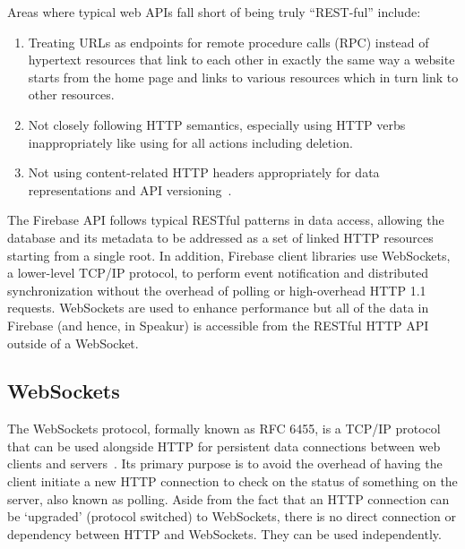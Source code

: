 Areas where typical web APIs fall short of being truly ``REST-ful'' include:
\begin{enumerate}
\item Treating URLs as endpoints for remote procedure calls (RPC) instead of hypertext resources that link to each other in exactly the same way a website starts from the home page and links to various resources which in turn link to other resources.
\item Not closely following HTTP semantics, especially using HTTP verbs inappropriately like using  for all actions including deletion.
\item Not using content-related HTTP headers appropriately for data representations and API versioning~\cite{steveklabnik2011}.
\end{enumerate}

The Firebase API follows typical RESTful patterns in data access, allowing the database 
and its metadata to be addressed as a set of linked HTTP resources starting from a single root.
In addition, Firebase client libraries use WebSockets, 
a lower-level TCP/IP protocol, 
to perform event notification and distributed synchronization without the overhead of polling or high-overhead HTTP 1.1 requests.
WebSockets are used to enhance performance but all of the data in Firebase 
(and hence, in Speakur) 
is accessible from the RESTful HTTP API outside of a WebSocket.

\subsection{WebSockets}
\label{sec:websockets}
The WebSockets protocol, formally known as RFC 6455, 
is a TCP/IP protocol that can be used alongside HTTP for persistent data connections between web clients and servers~\cite{mozillacontributors2015-a}.
Its primary purpose is to avoid the overhead of having the client initiate a new HTTP connection to check on the status of something on the server, also known as polling.
Aside from the fact that an HTTP connection can be `upgraded' (protocol switched) to WebSockets,
there is no direct connection or dependency between HTTP and WebSockets.
They can be used independently.

